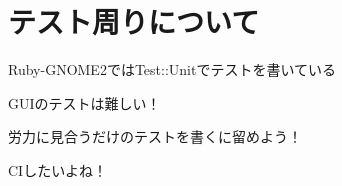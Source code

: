 \section{テスト周りについて}
\begin{frame}
\begin{itemize}
{\huge
\item{} Ruby-GNOME2ではTest::Unitでテストを書いている
\item{} GUIのテストは難しい！
\item{} 労力に見合うだけのテストを書くに留めよう！
\item{} CIしたいよね！
}
\end{itemize}
\end{frame}
